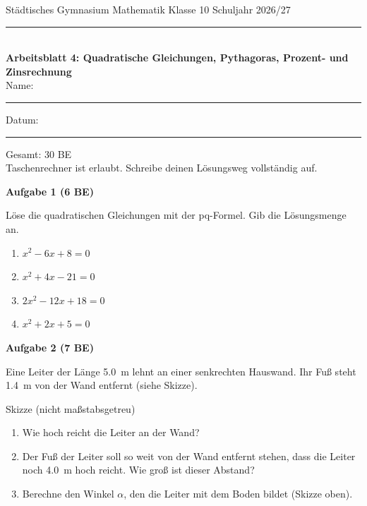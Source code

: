 \documentclass[12pt,a4paper]{article}
\newcommand{\aufgabe}[2]{\bigskip\par\textbf{Aufgabe #1 (#2 BE)}\par\nopagebreak\smallskip}
\begin{document}
{\small Städtisches Gymnasium \textperiodcentered{} Mathematik \textperiodcentered{} Klasse 10 \hfill Schuljahr 2026/27}\\[-0.4em]
\rule{\linewidth}{0.6pt}\\[0.5em]
{\Large\bfseries Arbeitsblatt 4: Quadratische Gleichungen, Pythagoras, Prozent- und Zinsrechnung}\\[0.5em]
Name: \rule{5cm}{0.4pt} \hfill Datum: \rule{3cm}{0.4pt} \hfill Gesamt: 30 BE\\[0.3em]
{\small Taschenrechner ist erlaubt. Schreibe deinen Lösungsweg vollständig auf.}

\aufgabe{1}{6}
Löse die quadratischen Gleichungen mit der pq-Formel. Gib die Lösungsmenge an.
\begin{enumerate}
  \item $x^2 - 6x + 8 = 0$
  \item $x^2 + 4x - 21 = 0$
  \item $2x^2 - 12x + 18 = 0$
  \item $x^2 + 2x + 5 = 0$
\end{enumerate}

\aufgabe{2}{7}
Eine Leiter der Länge \qty{5.0}{m} lehnt an einer senkrechten Hauswand. Ihr Fuß steht \qty{1.4}{m}
von der Wand entfernt (siehe Skizze).

\begin{center}

\small Skizze (nicht maßstabsgetreu)
\end{center}
\begin{enumerate}
  \item Wie hoch reicht die Leiter an der Wand?
  \item Der Fuß der Leiter soll so weit von der Wand entfernt stehen, dass die Leiter noch \qty{4.0}{m}
        hoch reicht. Wie groß ist dieser Abstand?
  \item Berechne den Winkel $\alpha$, den die Leiter mit dem Boden bildet (Skizze oben).
\end{enumerate}
\end{document}
